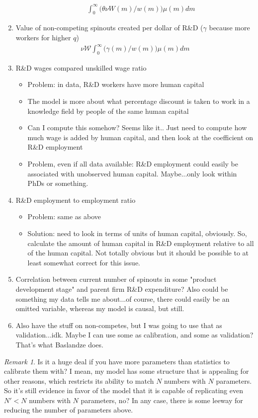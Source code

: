 \documentclass[12pt,english]{article}
\theoremstyle{remark}
\newtheorem{remark}{Remark}
\begin{document}
\begin{enumerate}
\begin{itemize}
		\begin{align*}
			\int_0^{\infty} \Big(\theta \nu W(m) / w(m) \Big) \mu(m) dm 
		\end{align*} 
	\end{itemize}
	\item Value of non-competing spinouts created per dollar of R\&D ($\gamma$ because more workers for higher $q$)
		\begin{align*}
		\nu \mathcal{W} \int_0^{\infty} \Big(\gamma(m) / w(m) \Big)\mu(m) dm 
		\end{align*}
	\item R\&D wages compared unskilled wage ratio
	\begin{itemize}
		\item Problem: in data, R\&D workers have more human capital
		\item The model is more about what percentage discount is taken to work in a knowledge field by people of the same human capital
		\item Can I compute this somehow? Seems like it.. Just need to compute how much wage is added by human capital, and then look at the coefficient on R\&D employment
		\item Problem, even if all data available: R\&D employment could easily be associated with unobserved human capital. Maybe...only look within PhDs or something. 
	\end{itemize}
	\item R\&D employment to employment ratio
	\begin{itemize}
		\item Problem: same as above
		\item Solution: need to look in terms of units of human capital, obviously. So, calculate the amount of human capital in R\&D employment relative to all of the human capital. Not totally obvious but it should be possible to at least somewhat correct for this issue. 
	\end{itemize}
	\item Correlation between current number of spinouts in some "product development stage" and parent firm R\&D expenditure? Also could be something my data tells me about...of course, there could easily be an omitted variable, whereas my model is causal, but still. 
	\item Also have the stuff on non-competes, but I was going to use that as validation...idk. Maybe I can use some as calibration, and some as validation? That's what Baslandze does. 
\end{enumerate}

\begin{remark}
	Is it a huge deal if you have more parameters than statistics to calibrate them with? I mean, my model has some structure that is appealing for other reasons, which restricts its ability to match $N$ numbers with $N$ parameters. So it's still evidence in favor of the model that it is capable of replicating even $N'<N$ numbers with $N$ parameters, no? In any case, there is some leeway for reducing the number of parameters above. 
\end{remark}
\end{document}

